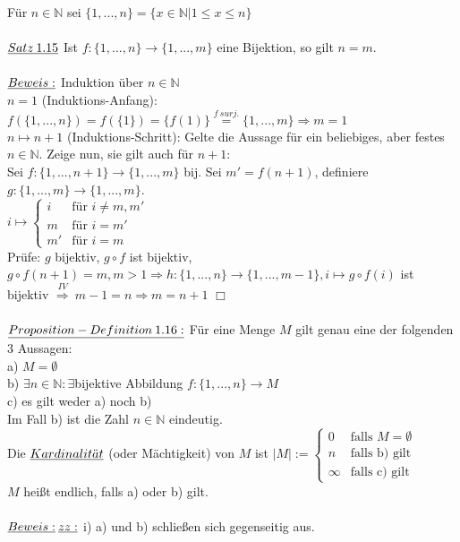 \documentclass[fleqn, a4paper, 11pt]{article}
\begin{document}
F\"ur $n\in\mathbb{N}$ sei $\{1,...,n\}=\{x\in\mathbb{N}|1\leq x\leq n\}$\\
\\
$\uline{Satz\:1.15}$ Ist $f:\{1,...,n\}\rightarrow\{1,...,m\}$ eine Bijektion, so gilt $n=m$.\\
\\
$\uline{Beweis:}$ Induktion \"uber $n\in\mathbb{N}$\\
$n=1$ (Induktions-Anfang): $f(\{1,...,n\})=f(\{1\})=\{f(1)\}\stackrel{f\:surj.}{=}\{1,...,m\}\Rightarrow m=1$\\
$n\mapsto n+1$ (Induktions-Schritt): Gelte die Aussage f\"ur ein beliebiges, aber festes $n\in\mathbb{N}$. Zeige nun, sie gilt auch f\"ur $n+1$:\\
Sei $f:\{1,...,n+1\}\rightarrow\{1,...,m\}$ bij. Sei $m'=f(n+1)$, definiere $g:\{1,...,m\}\rightarrow\{1,...,m\}$.\\
$i\mapsto\begin{cases}
	i & \text{f\"ur } i\neq m,m'\\
	m & \text{f\"ur } i=m'\\
	m' & \text{f\"ur } i=m
\end{cases}$\\
Pr\"ufe: $g$ bijektiv, $g\circ f$ ist bijektiv, $g\circ f(n+1)=m,m>1\Rightarrow h:\{1,...,n\}\rightarrow\{1,...,m-1\},i\mapsto g\circ f(i)$ ist bijektiv $\stackrel{IV}{\Rightarrow}\:m-1=n \Rightarrow m=n+1$ \hfill $\Box$\\
\\
$\uline{Proposition-Definition\:1.16:}$ F\"ur eine Menge $M$ gilt genau eine der folgenden 3 Aussagen:\\
a) $M=\emptyset$\\
b) $\exists n\in\mathbb{N}:\exists$bijektive Abbildung $f:\{1,...,n\}\rightarrow M$\\
c) es gilt weder a) noch b)\\
Im Fall b) ist die Zahl $n\in\mathbb{N}$ eindeutig.\\
Die $\uline{Kardinalit\ddot{a}t}$ (oder M\"achtigkeit) von $M$ ist $|M|:=\begin{cases}
	0 & \text{falls } M=\emptyset \\
	n & \text{falls b) gilt} \\
	\infty & \text{falls c) gilt}
\end{cases}$\\
$M$ hei\ss{}t endlich, falls a) oder b) gilt.\\
\\
$\uline{Beweis:}\:\uline{zz:}$ i) a) und b) schlie\ss{}en sich gegenseitig aus.\\
\end{document}
